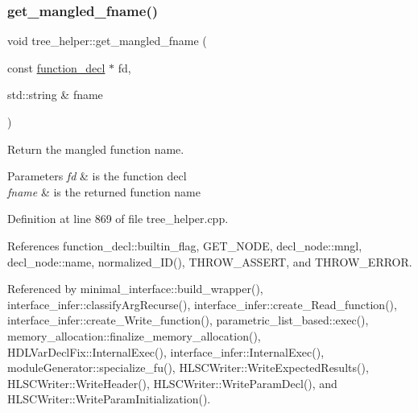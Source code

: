 \subsubsection{\texorpdfstring{get\+\_\+mangled\+\_\+fname()}{get\_mangled\_fname()}}
{\footnotesize\ttfamily void tree\+\_\+helper\+::get\+\_\+mangled\+\_\+fname (\begin{DoxyParamCaption}\item[{const \hyperlink{structfunction__decl}{function\+\_\+decl} $\ast$}]{fd,  }\item[{std\+::string \&}]{fname }\end{DoxyParamCaption})\hspace{0.3cm}{\ttfamily [static]}}



Return the mangled function name. 


\begin{DoxyParams}{Parameters}
{\em fd} & is the function decl \\
\hline
{\em fname} & is the returned function name \\
\hline
\end{DoxyParams}


Definition at line 869 of file tree\+\_\+helper.\+cpp.



References function\+\_\+decl\+::builtin\+\_\+flag, G\+E\+T\+\_\+\+N\+O\+DE, decl\+\_\+node\+::mngl, decl\+\_\+node\+::name, normalized\+\_\+\+I\+D(), T\+H\+R\+O\+W\+\_\+\+A\+S\+S\+E\+RT, and T\+H\+R\+O\+W\+\_\+\+E\+R\+R\+OR.



Referenced by minimal\+\_\+interface\+::build\+\_\+wrapper(), interface\+\_\+infer\+::classify\+Arg\+Recurse(), interface\+\_\+infer\+::create\+\_\+\+Read\+\_\+function(), interface\+\_\+infer\+::create\+\_\+\+Write\+\_\+function(), parametric\+\_\+list\+\_\+based\+::exec(), memory\+\_\+allocation\+::finalize\+\_\+memory\+\_\+allocation(), H\+D\+L\+Var\+Decl\+Fix\+::\+Internal\+Exec(), interface\+\_\+infer\+::\+Internal\+Exec(), module\+Generator\+::specialize\+\_\+fu(), H\+L\+S\+C\+Writer\+::\+Write\+Expected\+Results(), H\+L\+S\+C\+Writer\+::\+Write\+Header(), H\+L\+S\+C\+Writer\+::\+Write\+Param\+Decl(), and H\+L\+S\+C\+Writer\+::\+Write\+Param\+Initialization().

